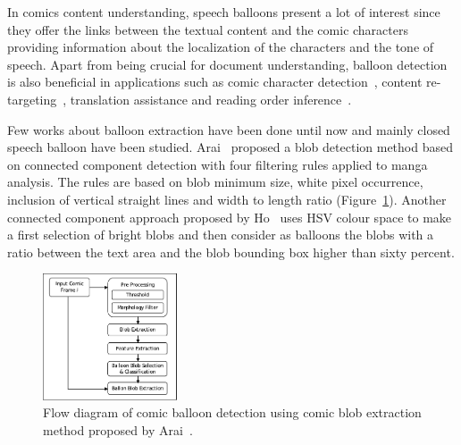 In comics content understanding, speech balloons present a lot of interest since they offer the links between the textual content and the comic characters providing information about the localization of the characters and the tone of speech.
Apart from being crucial for document understanding, balloon detection is also beneficial in applications such as comic character detection~\cite{Sun2011}, content re-targeting~\cite{Matsui2011}, translation assistance and reading order inference~\cite{Guerin2012Ontologies}.

Few works about balloon extraction have been done until now and mainly closed speech balloon have been studied.
Arai~\cite{Arai11} proposed a blob detection method based on connected component detection with four filtering rules applied to manga analysis.
The rules are based on blob minimum size, white pixel occurrence, inclusion of vertical straight lines and width to length ratio (Figure~\ref{fig:Arai_balloon_extraction_process}).
Another connected component approach proposed by Ho~\cite{Ho2012} uses HSV colour space to make a first selection of bright blobs and then consider as balloons the blobs with a ratio between the text area and the blob bounding box higher than sixty percent.


 \begin{figure}[!ht]  %
   \centering
  \includegraphics[trim= 0px 0px 0px 0px, clip, width=150px]{Arai_balloon_extraction_process.pdf}
  \caption[Flow diagram of comic balloon detection]{Flow diagram of comic balloon detection using comic blob extraction method proposed by Arai~\cite{Arai11}.}
  \label{fig:Arai_balloon_extraction_process}
 \end{figure}

